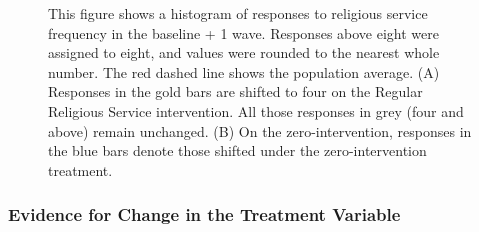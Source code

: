 \documentclass[
  single column]{article}
\begin{document}
\begin{figure}


\caption{\label{fig-hist}This figure shows a histogram of responses to
religious service frequency in the baseline + 1 wave. Responses above
eight were assigned to eight, and values were rounded to the nearest
whole number. The red dashed line shows the population average. (A)
Responses in the gold bars are shifted to four on the Regular Religious
Service intervention. All those responses in grey (four and above)
remain unchanged. (B) On the zero-intervention, responses in the blue
bars denote those shifted under the zero-intervention treatment.}

\end{figure}%

\newpage{}

\subsubsection{Evidence for Change in the Treatment
Variable}\label{evidence-for-change-in-the-treatment-variable}
\end{document}
